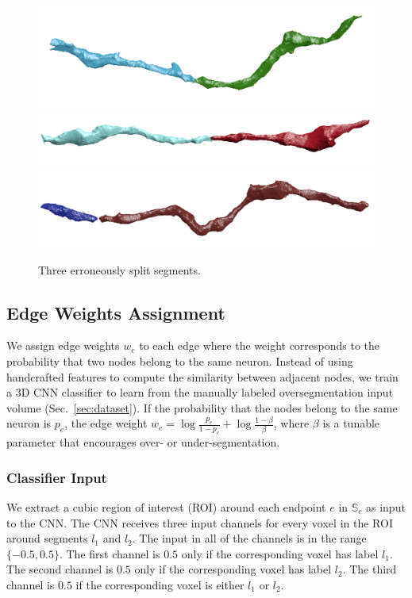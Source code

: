 \begin{figure}[t]
	\centering
	\includegraphics[width=0.92\linewidth]{./figures/split_error1.png}
	\includegraphics[width=0.92\linewidth]{./figures/split_error2.png}		\includegraphics[width=0.85\linewidth]{./figures/merge_candidate2.png}
	\caption{Three erroneously split segments.}
	\label{fig:merge_candidates}
\end{figure}

\subsection{Edge Weights Assignment}
We assign edge weights $w_e$ to each edge where the weight corresponds to the probability that two nodes belong to the same neuron.
Instead of using handcrafted features to compute the similarity between adjacent nodes, we train a 3D CNN classifier to learn from the manually labeled oversegmentation input volume (Sec.~\ref{sec:dataset}).
If the probability that the nodes belong to the same neuron is $p_e$, the edge weight $w_e = \log{\frac{p_e}{1 - p_e}} + \log{\frac{1 - \beta}{\beta}}$, where $\beta$ is a tunable parameter that encourages over- or under-segmentation.

\subsubsection{Classifier Input}

We extract a cubic region of interest (ROI) around each endpoint $e$ in $\mathbb{S}_c$ as input to the CNN. The CNN receives three input channels for every voxel in the ROI around segments $l_1$ and $l_2$. The input in all of the channels is in the range $\{-0.5, 0.5\}$. The first channel is $0.5$ only if the corresponding voxel has label $l_1$. The second channel is $0.5$ only if the corresponding voxel has label $l_2$. The third channel is $0.5$ if the corresponding voxel is either $l_1$ or $l_2$.

